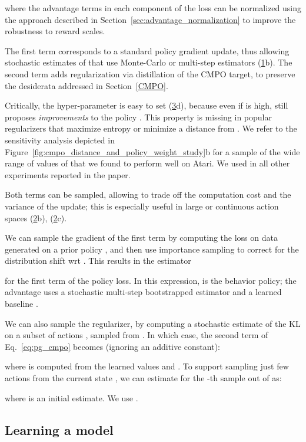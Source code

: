 \documentclass{article}
\newcommand{\desireObservability}[1]{(\hyperref[table-desiderata]{1}#1)}
\newcommand{\desirePolicy}[1]{(\hyperref[table-desiderata]{2}#1)}
\newcommand{\desireRobust}[1]{(\hyperref[table-desiderata]{3}#1)}
\begin{document}
where the advantage terms in each component of the loss can be normalized using the approach described in Section~\ref{sec:advantage_normalization} to improve the robustness to reward scales.

The first term corresponds to a standard policy gradient update, thus allowing  stochastic estimates of  that use Monte-Carlo or multi-step estimators \desireObservability{b}. The second term adds regularization via distillation of the CMPO target, to preserve the desiderata addressed in Section~\ref{CMPO}. 

Critically, the hyper-parameter  is easy to set \desireRobust{d}, because even if  is high,  still proposes \emph{improvements} to the policy . This property is missing in popular regularizers that maximize entropy or minimize a distance from . We refer to the sensitivity analysis depicted in Figure~\ref{fig:cmpo_distance_and_policy_weight_study}b for a sample of the wide range of values of  that we found to perform well on Atari. We used  in all other experiments reported in the paper. 

Both terms can be sampled, allowing to trade off the computation cost and the variance of the update; this is especially useful in large or continuous action spaces \desirePolicy{b}, \desirePolicy{c}. 

We can sample the gradient of the first term by computing the loss on data generated on a prior policy , and then use importance sampling to correct for the distribution shift wrt . This results in the estimator

for the first term of the policy loss. In this expression,  is the behavior policy; the advantage  uses a stochastic multi-step bootstrapped estimator  and a learned baseline .

We can also sample the regularizer, by computing a stochastic estimate of the KL on a subset of  actions , sampled from . In which case, the second term of Eq.~\ref{eq:pg_cmpo} becomes (ignoring an additive constant):

where   is computed from the learned values  and . To support sampling just few actions from the current state , we can estimate  for the -th sample out of  as:

where  is an initial estimate. We use .

\subsection{Learning a model}
\end{document}
